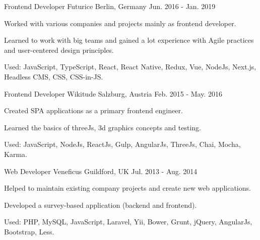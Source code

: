 

\begin{cventries}

  \cventry
    {Frontend Developer} %
    {Futurice} %
    {Berlin, Germany} %
    {Jun. 2016 - Jan. 2019} %
    {
      \begin{cvitems} %
        \item {Worked with various companies and projects mainly as frontend developer.}
        \item {Learned to work with big teams and gained a lot experience with Agile practices and user-centered design principles.}
        \item {Used: JavaScript, TypeScript, React, React Native, Redux, Vue, NodeJs, Next.js, Headless CMS, CSS, CSS-in-JS.}
      \end{cvitems}
    }

  \cventry
    {Frontend Developer} %
    {Wikitude} %
    {Salzburg, Austria} %
    {Feb. 2015 - May. 2016} %
    {
      \begin{cvitems} %
        \item {Created SPA applications as a primary frontend engineer.}
        \item {Learned the basics of threeJs, 3d graphics concepts and testing.}
        \item {Used: JavaScript, NodeJs, ReactJs, Gulp, AngularJs, ThreeJs, Chai, Mocha, Karma.}
      \end{cvitems}
    }

  \cventry
    {Web Developer} %
    {Veneficus} %
    {Guildford, UK} %
    {Jul. 2013 - Aug. 2014} %
    {
      \begin{cvitems} %
        \item {Helped to maintain existing company projects and create new web applications.}
        \item {Developed a survey-based application (backend and frontend).}
        \item {Used: PHP, MySQL, JavaScript, Laravel, Yii, Bower, Grunt, jQuery, AngularJs, Bootstrap, Less.}
      \end{cvitems}
    }

\end{cventries}
